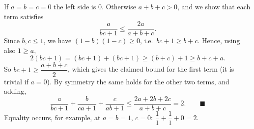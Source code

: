 If $a=b=c=0$ the left side is $0$. Otherwise $a+b+c>0$, and we show that each term satisfies
\[
\dfrac{a}{bc+1}\le\dfrac{2a}{a+b+c}.
\]
Since $b,c\le1$, we have $(1-b)(1-c)\ge0$, i.e.\ $bc+1\ge b+c$. Hence, using also $1\ge a$,
\[
2(bc+1)=(bc+1)+(bc+1)\ge(b+c)+1\ge b+c+a .
\]
So $bc+1\ge\dfrac{a+b+c}{2}$, which gives the claimed bound for the first term (it is trivial if $a=0$). By symmetry the same holds for the other two terms, and adding,
\[
\dfrac{a}{bc+1}+\dfrac{b}{ca+1}+\dfrac{c}{ab+1}\le\dfrac{2a+2b+2c}{a+b+c}=2 .\qquad\blacksquare
\]
Equality occurs, for example, at $a=b=1$, $c=0$: $\dfrac{1}{1}+\dfrac{1}{1}+0=2$.
